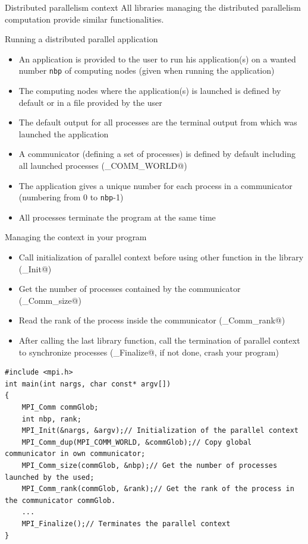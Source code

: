 \documentclass[compress,10pt,aspectratio=169]{beamer}
\begin{document}
\begin{frame}[fragile]{Distributed parallelism context}
    \small
    All libraries managing the distributed parallelism computation provide similar functionalities.

    \begin{block}{\small Running a distributed parallel application}
        \begin{itemize}
            \scriptsize
            \item An application is provided to the user to run his application(s) on a wanted number \texttt{nbp} of computing nodes (given when running the application)
            \item The computing nodes where the application(s) is launched is defined by default or in a file provided by the user
            \item The default output for all processes are the terminal output from which was launched the application
            \item A communicator (defining a set of processes) is defined by default including all launched processes (\verb@MPI_COMM_WORLD@)
            \item The application gives a unique number for each process in a communicator (numbering from 0 to \texttt{nbp}-1)
            \item All processes terminate the program at the same time
        \end{itemize}
    \end{block}
\end{frame}

\begin{frame}[fragile]{Managing the context in your program}
    \small
    \begin{itemize}
        \item Call initialization of parallel context before using other function in the library (\verb@MPI_Init@)
        \item Get the number of processes contained by the communicator (\verb@MPI_Comm_size@)
        \item Read the rank of the process inside the communicator (\verb@MPI_Comm_rank@)
        \item After calling the last library function, call the termination of parallel context to synchronize processes (\verb@MPI_Finalize@, if not done, crash your program)
    \end{itemize}

\begin{verbatim}
#include <mpi.h>
int main(int nargs, char const* argv[])
{
    MPI_Comm commGlob;
    int nbp, rank;
    MPI_Init(&nargs, &argv);// Initialization of the parallel context
    MPI_Comm_dup(MPI_COMM_WORLD, &commGlob);// Copy global communicator in own communicator;
    MPI_Comm_size(commGlob, &nbp);// Get the number of processes launched by the used;
    MPI_Comm_rank(commGlob, &rank);// Get the rank of the process in the communicator commGlob.
    ...
    MPI_Finalize();// Terminates the parallel context
}
\end{verbatim}

\end{frame}
\end{document}
